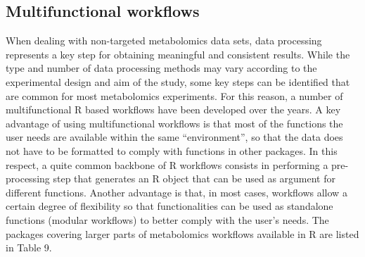 \documentclass[]{article}
\begin{document}
\newpage

\hypertarget{multifunctional-workflows}{%
\subsection{Multifunctional workflows}\label{multifunctional-workflows}}

When dealing with non-targeted metabolomics data sets, data processing represents a key step for obtaining meaningful and consistent results. While the type and number of data processing methods may vary according to the experimental design and aim of the study, some key steps can be identified that are common for most metabolomics experiments. For this reason, a number of multifunctional R based workflows have been developed over the years. A key advantage of using multifunctional workflows is that most of the functions the user needs are available within the same ``environment'', so that the data does not have to be formatted to comply with functions in other packages. In this respect, a quite common backbone of R workflows consists in performing a pre-processing step that generates an R object that can be used as argument for different functions. Another advantage is that, in most cases, workflows allow a certain degree of flexibility so that functionalities can be used as standalone functions (modular workflows) to better comply with the user's needs. The packages covering larger parts of metabolomics workflows available in R are listed in Table 9.
\end{document}
